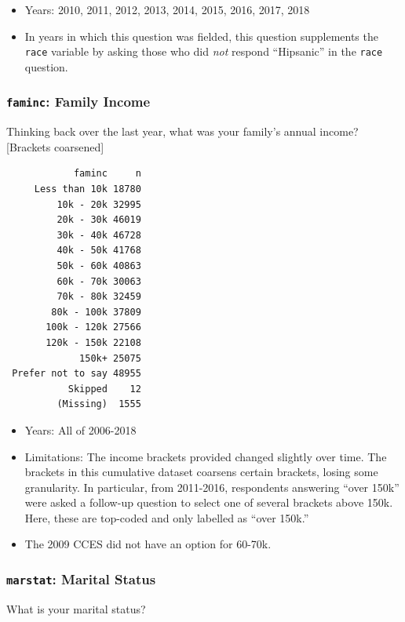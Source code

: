 \documentclass[10pt,article,oneside]{memoir}
\theoremstyle{definition}
\begin{document}
\begin{itemize}
\tightlist
\item
  Years: 2010, 2011, 2012, 2013, 2014, 2015, 2016, 2017, 2018
\item
  In years in which this question was fielded, this question supplements
  the \texttt{race} variable by asking those who did \emph{not} respond
  ``Hipsanic'' in the \texttt{race} question.
\end{itemize}

\subsubsection{\texorpdfstring{\texttt{faminc}: Family
Income}{faminc: Family Income}}\label{faminc-family-income}

Thinking back over the last year, what was your family's annual income?
{[}Brackets coarsened{]}

\begin{verbatim}
            faminc     n
     Less than 10k 18780
         10k - 20k 32995
         20k - 30k 46019
         30k - 40k 46728
         40k - 50k 41768
         50k - 60k 40863
         60k - 70k 30063
         70k - 80k 32459
        80k - 100k 37809
       100k - 120k 27566
       120k - 150k 22108
             150k+ 25075
 Prefer not to say 48955
           Skipped    12
         (Missing)  1555
\end{verbatim}

\begin{itemize}
\tightlist
\item
  Years: All of 2006-2018
\item
  Limitations: The income brackets provided changed slightly over time.
  The brackets in this cumulative dataset coarsens certain brackets,
  losing some granularity. In particular, from 2011-2016, respondents
  answering ``over 150k'' were asked a follow-up question to select one
  of several brackets above 150k. Here, these are top-coded and only
  labelled as ``over 150k.''
\item
  The 2009 CCES did not have an option for 60-70k.
\end{itemize}

\subsubsection{\texorpdfstring{\texttt{marstat}: Marital
Status}{marstat: Marital Status}}\label{marstat-marital-status}

What is your marital status?
\end{document}
